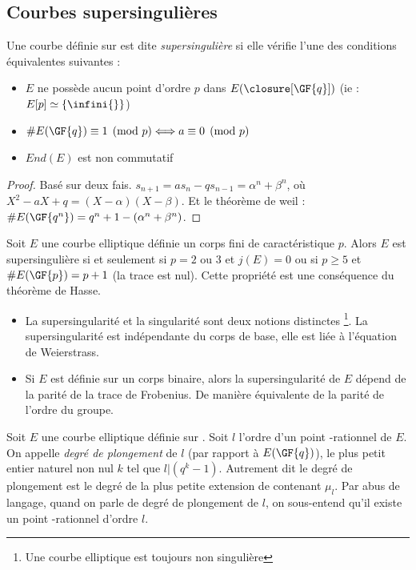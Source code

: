 \subsection{Courbes supersingulières}
\begin{definition}
Une courbe définie sur  est dite \emph{supersingulière} si elle vérifie l'une des conditions équivalentes suivantes : 
\begin{itemize}[label=--]
    \item $E$ ne possède aucun point d'ordre $p$ dans $E(\closure[\GF{q}])$ (ie : $E[p] \simeq \{ \infini{} \}$)
    \item $\# E(\GF{q}) \equiv 1 \pmod p \Longleftrightarrow a \equiv 0 \pmod p$
    \item $End(E)$ est non commutatif
\end{itemize}
\end{definition}
\begin{proof}
Basé sur deux fais. $s_{n+1} = as_n -qs_{n-1} = \alpha^n + \beta^n$, où $X^2 - aX + q = (X - \alpha)(X - \beta)$. Et le théorème de weil : $\# E(\GF{q^n}) = q^n + 1 - (\alpha^n + \beta^n)$. 
\end{proof}


\begin{propriete}
Soit $E$ une courbe elliptique définie un corps fini  de caractéristique $p$. Alors $E$ est supersingulière si et seulement si $p = 2$ ou $3$ et $j(E) = 0$ ou si $p \geq 5$ et $\# E(\GF{p}) = p + 1$ (la trace est nul).
Cette propriété est une conséquence du théorème de Hasse.
\end{propriete}

\begin{itemize}[label=--]
    \item La supersingularité et la singularité sont deux notions distinctes \footnote{Une courbe elliptique est toujours non singulière}. La supersingularité est indépendante du corps de base, elle est liée à l'équation de Weierstrass.
    \item Si $E$ est définie sur un corps binaire, alors la supersingularité de $E$ dépend de la parité de la trace de Frobenius. De manière équivalente de la parité de l'ordre du groupe.
\end{itemize}


\begin{definition}
Soit $E$ une courbe elliptique définie sur . Soit $l$ l'ordre d'un point -rationnel de $E$. On appelle \emph{degré de plongement} de $l$ (par rapport à $E(\GF{q})$), le plus petit entier naturel non nul $k$ tel que $l | (q^k -1)$. Autrement dit le degré de plongement est le degré de la plus petite extension de  contenant $\mu_l$.
Par abus de langage, quand on parle de degré de plongement de $l$, on sous-entend qu'il existe un point -rationnel d'ordre $l$.
\end{definition}


